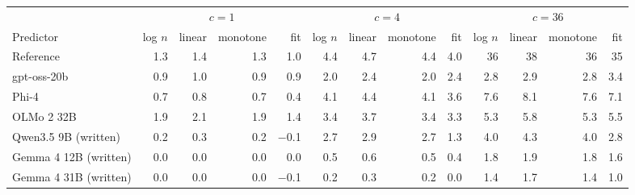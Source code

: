 \begin{tabular}{lrrrrrrrrrrrr}
\toprule
 & \multicolumn{4}{c}{$c = 1$} & \multicolumn{4}{c}{$c = 4$} & \multicolumn{4}{c}{$c = 36$} \\
\cmidrule(lr){2-5} \cmidrule(lr){6-9} \cmidrule(lr){10-13}
Predictor & log $n$ & linear & monotone & fit & log $n$ & linear & monotone & fit & log $n$ & linear & monotone & fit \\
\midrule
Reference & 1.3 & 1.4 & 1.3 & 1.0 & 4.4 & 4.7 & 4.4 & 4.0 & 36 & 38 & 36 & 35 \\
\midrule
gpt-oss-20b & 0.9 & 1.0 & 0.9 & 0.9 & 2.0 & 2.4 & 2.0 & 2.4 & 2.8 & 2.9 & 2.8 & 3.4 \\
Phi-4 & 0.7 & 0.8 & 0.7 & 0.4 & 4.1 & 4.4 & 4.1 & 3.6 & 7.6 & 8.1 & 7.6 & 7.1 \\
OLMo 2 32B & 1.9 & 2.1 & 1.9 & 1.4 & 3.4 & 3.7 & 3.4 & 3.3 & 5.3 & 5.8 & 5.3 & 5.5 \\
Qwen3.5 9B (written) & 0.2 & 0.3 & 0.2 & $-$0.1 & 2.7 & 2.9 & 2.7 & 1.3 & 4.0 & 4.3 & 4.0 & 2.8 \\
Gemma 4 12B (written) & 0.0 & 0.0 & 0.0 & 0.0 & 0.5 & 0.6 & 0.5 & 0.4 & 1.8 & 1.9 & 1.8 & 1.6 \\
Gemma 4 31B (written) & 0.0 & 0.0 & 0.0 & $-$0.1 & 0.2 & 0.3 & 0.2 & 0.0 & 1.4 & 1.7 & 1.4 & 1.0 \\
\bottomrule
\end{tabular}
